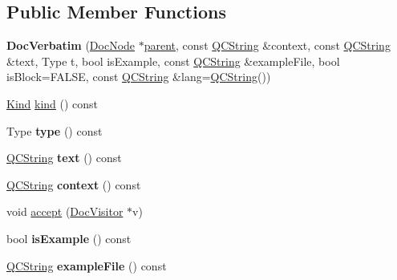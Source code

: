 \subsection*{Public Member Functions}
\begin{DoxyCompactItemize}
\item 
\mbox{\label{class_doc_verbatim_aa70e913a828657ceb4caf804417f2f7c}} 
{\bfseries Doc\+Verbatim} (\mbox{\hyperlink{class_doc_node}{Doc\+Node}} $\ast$\mbox{\hyperlink{class_doc_node_a73e8ad29a91cfceb0968eb00db71a23d}{parent}}, const \mbox{\hyperlink{class_q_c_string}{Q\+C\+String}} \&context, const \mbox{\hyperlink{class_q_c_string}{Q\+C\+String}} \&text, Type t, bool is\+Example, const \mbox{\hyperlink{class_q_c_string}{Q\+C\+String}} \&example\+File, bool is\+Block=F\+A\+L\+SE, const \mbox{\hyperlink{class_q_c_string}{Q\+C\+String}} \&lang=\mbox{\hyperlink{class_q_c_string}{Q\+C\+String}}())
\item 
\mbox{\hyperlink{class_doc_node_aebd16e89ca590d84cbd40543ea5faadb}{Kind}} \mbox{\hyperlink{class_doc_verbatim_a3c7e3c656ba8812a29eb68e99bd96e46}{kind}} () const
\item 
\mbox{\label{class_doc_verbatim_a643407838e6684602459062da9f9d2ec}} 
Type {\bfseries type} () const
\item 
\mbox{\label{class_doc_verbatim_a7570e40ac3f0b1bb946c81aa1f384d2f}} 
\mbox{\hyperlink{class_q_c_string}{Q\+C\+String}} {\bfseries text} () const
\item 
\mbox{\label{class_doc_verbatim_a58a8316261706c1b74b8396742bf86b8}} 
\mbox{\hyperlink{class_q_c_string}{Q\+C\+String}} {\bfseries context} () const
\item 
void \mbox{\hyperlink{class_doc_verbatim_ae98dce2edd2ad0fa399930f8e61ee9b0}{accept}} (\mbox{\hyperlink{class_doc_visitor}{Doc\+Visitor}} $\ast$v)
\item 
\mbox{\label{class_doc_verbatim_a56e82d369d1af07c80e299d33a5836ea}} 
bool {\bfseries is\+Example} () const
\item 
\mbox{\label{class_doc_verbatim_a77801c92a718d54461dd551f0c5ed235}} 
\mbox{\hyperlink{class_q_c_string}{Q\+C\+String}} {\bfseries example\+File} () const
\item 

\end{DoxyCompactItemize}
